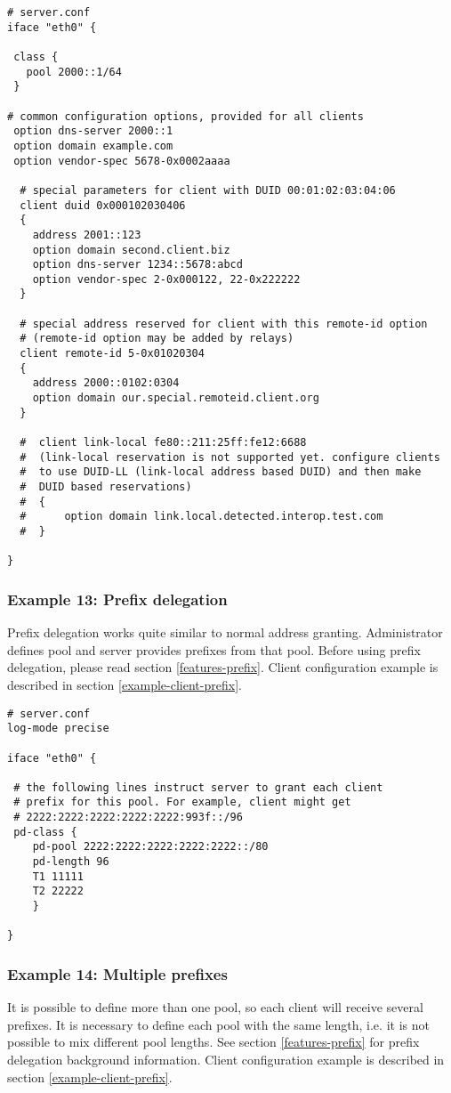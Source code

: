 \begin{lstlisting}
# server.conf
iface "eth0" {

 class {
   pool 2000::1/64
 }

# common configuration options, provided for all clients
 option dns-server 2000::1
 option domain example.com
 option vendor-spec 5678-0x0002aaaa

  # special parameters for client with DUID 00:01:02:03:04:06
  client duid 0x000102030406
  {
	address 2001::123
	option domain second.client.biz
	option dns-server 1234::5678:abcd
	option vendor-spec 2-0x000122, 22-0x222222
  }

  # special address reserved for client with this remote-id option
  # (remote-id option may be added by relays)
  client remote-id 5-0x01020304
  {
	address 2000::0102:0304
	option domain our.special.remoteid.client.org
  }

  #  client link-local fe80::211:25ff:fe12:6688
  #  (link-local reservation is not supported yet. configure clients
  #  to use DUID-LL (link-local address based DUID) and then make
  #  DUID based reservations)
  #  {
  #      option domain link.local.detected.interop.test.com
  #  }

}
\end{lstlisting}

\subsubsection{Example 13: Prefix delegation}
\label{example-server-prefix}

Prefix delegation works quite similar to normal address granting.
Administrator defines pool and server provides prefixes from that
pool. Before using prefix delegation, please read section
\ref{features-prefix}. Client configuration example is described in section
\ref{example-client-prefix}.

\begin{lstlisting}
# server.conf
log-mode precise

iface "eth0" {

 # the following lines instruct server to grant each client
 # prefix for this pool. For example, client might get
 # 2222:2222:2222:2222:2222:993f::/96
 pd-class {
	pd-pool 2222:2222:2222:2222:2222::/80
	pd-length 96
	T1 11111
	T2 22222
    }

}
\end{lstlisting}

\subsubsection{Example 14: Multiple prefixes}
\label{example-server-prefixes}
It is possible to define more than one pool, so each client will
receive several prefixes. It is necessary to define each pool with the
same length, i.e. it is not possible to mix different pool lengths.
See section \ref{features-prefix} for prefix delegation background
information. Client configuration example is described in section
\ref{example-client-prefix}.

